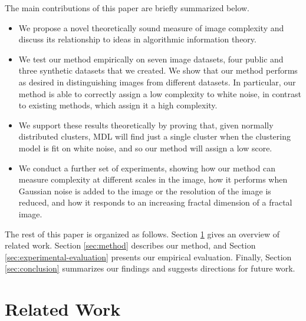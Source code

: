 \documentclass[a4paper,fleqn]{cas-sc}
\theoremstyle{remark}
\begin{document}
The main contributions of this paper are briefly summarized below.
\begin{itemize}  
    \item We propose a novel theoretically sound measure of image complexity and discuss its relationship to ideas in algorithmic information theory.
    \item We test our method empirically on seven image datasets, four public and three synthetic datasets that we created. We show that our method performs as desired in distinguishing images from different datasets. In particular, our method is able to correctly assign a low complexity to white noise, in contrast to existing methods, which assign it a high complexity.
    \item We support these results theoretically by proving that, given normally distributed clusters, MDL will find just a single cluster when the clustering model is fit on white noise, and so our method will assign a low score.
    \item We conduct a further set of experiments, showing how our method can measure complexity at different scales in the image, how it performs when Gaussian noise is added to the image or the resolution of the image is reduced, and how it responds to an increasing fractal dimension of a fractal image. 
\end{itemize}
The rest of this paper is organized as follows. Section \ref{sec:related-work} gives an overview of related work. Section \ref{sec:method} describes our method, and Section \ref{sec:experimental-evaluation} presents our empirical evaluation. Finally, Section \ref{sec:conclusion} summarizes our findings and suggests directions for future work.


\section{Related Work} \label{sec:related-work}
\end{document}
